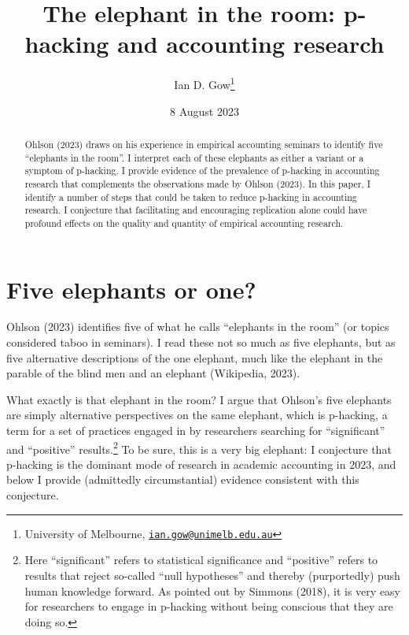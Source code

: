 \documentclass[
  letterpaper,
  DIV=11,
  numbers=noendperiod]{scrartcl}
\title{The elephant in the room: p-hacking and accounting research}
\author{Ian D. Gow\footnote{University of Melbourne,
  \href{mailto:ian.gow@unimelb.edu.au}{\nolinkurl{ian.gow@unimelb.edu.au}}}}
\date{8 August 2023}
\begin{document}
\maketitle
\begin{abstract}
Ohlson (2023) draws on his experience in empirical accounting seminars
to identify five ``elephants in the room''. I interpret each of these
elephants as either a variant or a symptom of p-hacking. I provide
evidence of the prevalence of p-hacking in accounting research that
complements the observations made by Ohlson (2023). In this paper, I
identify a number of steps that could be taken to reduce p-hacking in
accounting research. I conjecture that facilitating and encouraging
replication alone could have profound effects on the quality and
quantity of empirical accounting research.
\end{abstract}
\ifdefined\Shaded\renewenvironment{Shaded}{\begin{tcolorbox}[interior hidden, frame hidden, sharp corners, borderline west={3pt}{0pt}{shadecolor}, boxrule=0pt, breakable, enhanced]}{\end{tcolorbox}}\fi

\hypertarget{five-elephants-or-one}{%
\section{Five elephants or one?}\label{five-elephants-or-one}}

Ohlson (2023) identifies five of what he calls ``elephants in the room''
(or topics considered taboo in seminars). I read these not so much as
five elephants, but as five alternative descriptions of the one
elephant, much like the elephant in the parable of the blind men and an
elephant (Wikipedia, 2023).

What exactly is that elephant in the room? I argue that Ohlson's five
elephants are simply alternative perspectives on the same elephant,
which is p-hacking, a term for a set of practices engaged in by
researchers searching for ``significant'' and ``positive''
results.\footnote{Here ``significant'' refers to statistical
  significance and ``positive'' refers to results that reject so-called
  ``null hypotheses'' and thereby (purportedly) push human knowledge
  forward. As pointed out by Simmons (2018), it is very easy for
  researchers to engage in p-hacking without being conscious that they
  are doing so.} To be sure, this is a very big elephant: I conjecture
that p-hacking is the dominant mode of research in academic accounting
in 2023, and below I provide (admittedly circumstantial) evidence
consistent with this conjecture.
\end{document}
